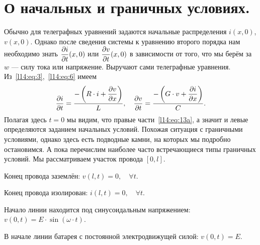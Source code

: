 \section{О начальных и граничных условиях.}
\label{lecture14section2}
Обычно для телеграфных уравнений задаются начальные распределения $i(x,0)$, $v(x,0)$. Однако после сведения системы к уравнению второго порядка нам необходимо знать $\displaystyle\frac{\partial i}{\partial t}(x,0)$ или $\displaystyle\frac{\partial v}{\partial t}(x,0)$ в зависимости от того, что мы берём за $w$ --- силу тока или напряжение. Выручают сами телеграфные уравнения. Из~\eqref{l14:eq:3},~\eqref{l14:eq:6} имеем 
\begin{equation}\label{l14:eq:13a}
	\hfill\pder{i}{t}=\displaystyle\frac{\displaystyle-\left(R\cdot i+\pder{v}{x}\right)}{L},\quad \pder{v}{t}=\displaystyle\frac{\displaystyle-\left(G\cdot v+\pder{i}{x}\right)}{C}.  \hfill
\end{equation}
Полагая здесь $t=0$ мы видим, что правые части~\eqref{l14:eq:13a}, а значит и левые определяются заданием начальных условий. Похожая ситуация с граничными условиями, однако здесь есть подводные камни, на которых мы подробно остановимся. А пока перечислим наиболее часто встречающиеся типы граничных условий. Мы рассматриваем участок провода $[0,l]$.
\begin{enumerateD}
	\item Конец провода заземлён: $v(l,t)=0,\quad\forall t$.
	\item Конец провода изолирован: $i(l,t)=0,\quad\forall t$.
	\item Начало линии находится под синусоидальным напряжением: $v(0,t)=E\cdot\sin\left(\omega\cdot t\right)$.
	\item В начале линии батарея с постоянной электродвижущей силой: $v(0,t)=E$.
\end{enumerateD}

